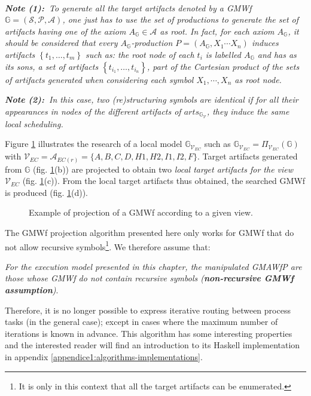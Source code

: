 \begin{algorithm}
\begin{mdframed}[style=MyFrame]
	~
	
	\noindent\textit{\textbf{Note (1):}$~$ To generate all the target artifacts denoted by a GMWf $\mathbb{G}=\left(\mathcal{S},\mathcal{P},\mathcal{A}\right)$, one just has to use the set of productions to generate the set of artifacts having one of the axiom $A_{\mathbb{G}}\in \mathcal{A}$ as root. In fact, for each axiom $A_{\mathbb{G}}$, it should be considered that every $A_{\mathbb{G}}$-production $P=\left(A_{\mathbb{G}},X_1\cdots X_n\right)$ induces artifacts $\left\{t_1, \ldots, t_m\right\}$ such as: the root node of each $t_i$ is labelled $A_{\mathbb{G}}$ and has as its sons, a set of artifacts $\left\{t_{i_1},\ldots,t_{i_n}\right\}$, part of the Cartesian product of the sets of artifacts generated when considering each symbol $X_1,\cdots, X_n$ as root node.}
	
	\noindent\textit{\textbf{Note (2):}$~$ In this case, two (re)structuring symbols are identical if for all their appearances in nodes of the different artifacts of $arts_{\mathbb{G}_{\mathcal{V}}}$, they induce the same local scheduling.}
\end{mdframed}
\end{algorithm}

Figure \ref{chap3:fig:gmwf-projection} illustrates the research of a local model $\mathbb{G}_{\mathcal{V}_{EC}}$ such as $\mathbb{G}_{\mathcal{V}_{EC}} = \Pi_{\mathcal{V}_{EC}}\left(\mathbb{G}\right)$ with $\mathcal{V}_{EC}=\mathcal{A}_{EC(r)}=\{A, B, C, D, H1, H2, I1, I2, F\}$. Target artifacts generated from $\mathbb{G}$ (fig. \ref{chap3:fig:gmwf-projection}(b)) are projected to obtain two \textit{local target artifacts for the view $\mathcal{V}_{EC}$} (fig. \ref{chap3:fig:gmwf-projection}(c)). 
From the local target artifacts thus obtained, the searched GMWf is produced (fig. \ref{chap3:fig:gmwf-projection}(d)).
\begin{figure}[ht!]
	\noindent
	\caption{Example of projection of a GMWf according to a given view.}
	\label{chap3:fig:gmwf-projection}
\end{figure}

The GMWf projection algorithm presented here only works for GMWf that do not allow recursive symbols\footnote{It is only in this context that all the target artifacts can be enumerated.}. We therefore assume that:
\begin{displayquote}
\textit{For the execution model presented in this chapter, the manipulated GMAWfP are those whose GMWf do not contain recursive symbols (\textbf{non-recursive GMWf assumption})}.
\end{displayquote} 
Therefore, it is no longer possible to express iterative routing between process tasks (in the general case); except in cases where the maximum number of iterations is known in advance. This algorithm has some interesting properties and the interested reader will find an introduction to its Haskell implementation in appendix \ref{appendice1:algorithms-implementations}.

